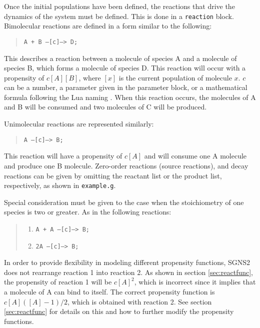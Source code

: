\documentclass[10pt]{article}
\newcommand{\code}[1]{{\tt {#1}}}
\newcommand{\programname}{SGNS2}
\begin{document}
Once the initial populations have been defined, the reactions that drive the dynamics of the system must be defined. This is done in a \code{reaction} block. Bimolecular reactions are defined in a form similar to the following:

\begin{quote}
\code{A + B --[c]--> D;}
\end{quote}

This describes a reaction between a molecule of species A and a molecule of species B, which forms a molecule of species D. This reaction will occur with a propensity of $c[A][B]$, where $[x]$ is the current population of molecule $x$. $c$ can be a number, a parameter given in the parameter block, or a mathematical formula following the Lua naming . When this reaction occurs, the molecules of A and B will be consumed and two molecules of C will be produced.

Unimolecular reactions are represented similarly:

\begin{quote}
\code{A --[c]--> B;}
\end{quote}

This reaction will have a propensity of $c[A]$ and will consume one A molecule and produce one B molecule. Zero-order reactions (source reactions), and decay reactions can be given by omitting the reactant list or the product list, respectively, as shown in \code{example.g}.

Special consideration must be given to the case when the stoichiometry of one species is two or greater. As in the following reactions:

\begin{quote}
\begin{enumerate}
\item \code{A + A --[c]--> B;}
\item \code{2A --[c]--> B;}
\end{enumerate}
\end{quote}

In order to provide flexibility in modeling different propensity functions, {\programname} does not rearrange reaction 1 into reaction 2. As shown in section \ref{sec:reactfunc}, the propensity of reaction 1 will be $c[A]^2$, which is incorrect since it implies that a molecule of A can bind to itself. The correct propensity function is $c[A]([A]-1)/2$, which is obtained with reaction 2. See section \ref{sec:reactfunc} for details on this and how to further modify the propensity functions.
\end{document}
